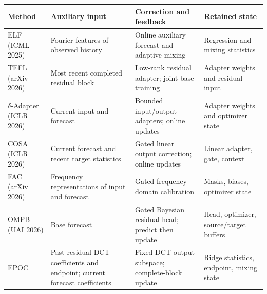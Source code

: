 \begingroup\fontsize{9}{11}\selectfont
\setlength{\tabcolsep}{3pt}
\begin{tabular}{@{}>{\raggedright\arraybackslash}p{.20\linewidth}>{\raggedright\arraybackslash}p{.24\linewidth}>{\raggedright\arraybackslash}p{.28\linewidth}>{\raggedright\arraybackslash}p{.20\linewidth}@{}}
\toprule
Method & Auxiliary input & Correction and feedback & Retained state \\
\midrule
ELF (ICML 2025) & Fourier features of observed history & Online auxiliary forecast and adaptive mixing & Regression and mixing statistics \\[3pt]
TEFL (arXiv 2026) & Most recent completed residual block & Low-rank residual adapter; joint base training & Adapter weights and residual input \\[3pt]
$\delta$-Adapter (ICLR 2026) & Current input and forecast & Bounded input/output adapters; online updates & Adapter weights and optimizer state \\[3pt]
COSA (ICLR 2026) & Current forecast and recent target statistics & Gated linear output correction; online updates & Linear adapter, gate, context \\[3pt]
FAC (arXiv 2026) & Frequency representations of input and forecast & Gated frequency-domain calibration & Masks, biases, optimizer state \\[3pt]
OMPB (UAI 2026) & Base forecast & Gated Bayesian residual head; predict then update & Head, optimizer, source/target buffers \\[3pt]
EPOC & Past residual DCT coefficients and endpoint; current forecast coefficients & Fixed DCT output subspace; complete-block update & Ridge statistics, endpoint, mixing state \\
\bottomrule
\end{tabular}
\endgroup
